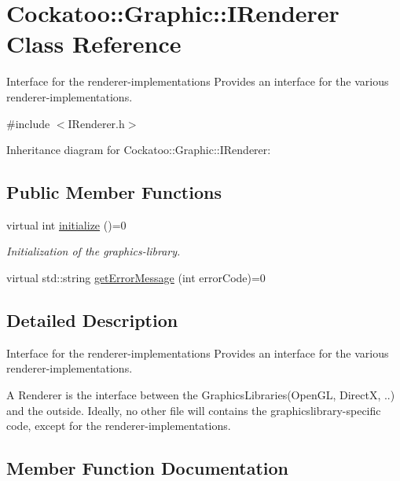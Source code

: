 \hypertarget{classCockatoo_1_1Graphic_1_1IRenderer}{}\section{Cockatoo\+:\+:Graphic\+:\+:I\+Renderer Class Reference}
\label{classCockatoo_1_1Graphic_1_1IRenderer}


Interface for the renderer-\/implementations Provides an interface for the various renderer-\/implementations.  




{\ttfamily \#include $<$I\+Renderer.\+h$>$}



Inheritance diagram for Cockatoo\+:\+:Graphic\+:\+:I\+Renderer\+:
\subsection*{Public Member Functions}
\begin{DoxyCompactItemize}
\item 
virtual int \hyperlink{classCockatoo_1_1Graphic_1_1IRenderer_a838c249862cf6189adb9304302348a1f}{initialize} ()=0
\begin{DoxyCompactList}\small\item\em Initialization of the graphics-\/library. \end{DoxyCompactList}\item 
virtual std\+::string \hyperlink{classCockatoo_1_1Graphic_1_1IRenderer_a255ff11545b8e2056a0bc493b9a37bcc}{get\+Error\+Message} (int error\+Code)=0
\end{DoxyCompactItemize}


\subsection{Detailed Description}
Interface for the renderer-\/implementations Provides an interface for the various renderer-\/implementations. 

A Renderer is the interface between the Graphics\+Libraries(Open\+GL, DirectX, ..) and the outside. Ideally, no other file will contains the graphicslibrary-\/specific code, except for the renderer-\/implementations. 

\subsection{Member Function Documentation}

